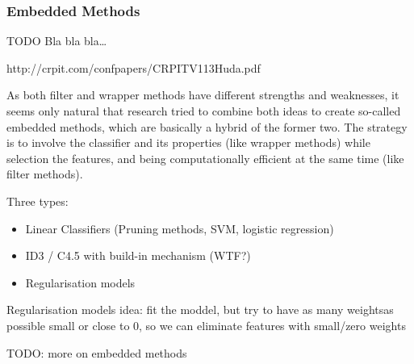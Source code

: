 \subsubsection{Embedded Methods}
\label{sec:methods.flat.embedded}


TODO
Bla bla bla\ldots

http://crpit.com/confpapers/CRPITV113Huda.pdf 

As both filter and wrapper methods have different strengths and weaknesses, 
it seems only natural that research tried to combine both ideas to create so-called embedded methods, 
which are basically a hybrid of the former two. 
The strategy is to involve the classifier and its properties (like wrapper methods) while selection the features, 
and being computationally efficient at the same time (like filter methods).

Three types:

\begin{itemize}
  \item Linear Classifiers (Pruning methods, SVM, logistic regression)
  \item ID3 / C4.5 with build-in mechanism (WTF?) 
  \item Regularisation models
\end{itemize}

Regularisation models idea: fit the moddel, but try to have as many weightsas
possible small or close to 0, so we can eliminate features with small/zero weights


TODO:  more on embedded methods